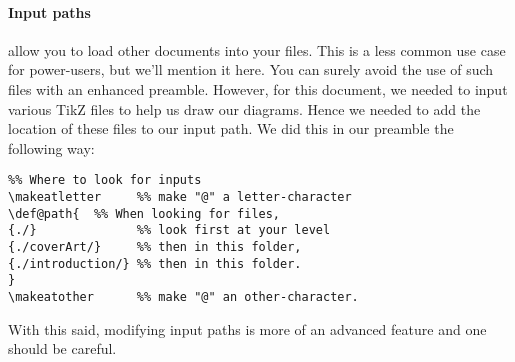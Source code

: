 \documentclass{ximera}
\begin{document}
\paragraph{Input paths} allow you to load other documents into your files.
This is a less common use case for power-users, but we'll mention it here. You can surely avoid
the use of such files with an enhanced preamble. However, for this document, we
needed to input various TikZ files to help us draw our diagrams. Hence we
needed to
add the location of these files to our input path. We did this in our preamble
the following way:
\begin{verbatim}
%% Where to look for inputs
\makeatletter     %% make "@" a letter-character
\def@path{  %% When looking for files,
{./}              %% look first at your level
{./coverArt/}     %% then in this folder,
{./introduction/} %% then in this folder.
}
\makeatother      %% make "@" an other-character.
\end{verbatim}
With this said, modifying input paths is more of an advanced feature and one
should be careful.
\end{document}

